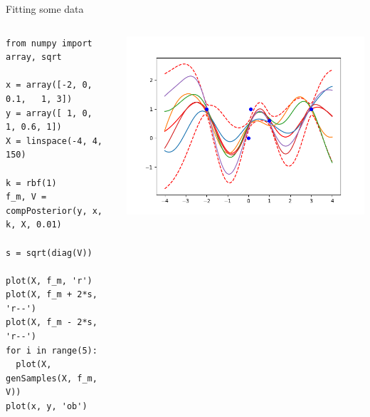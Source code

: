 \documentclass[presentation]{beamer}
\begin{document}
\begin{frame}[fragile,label={sec:org9f2662d}]{Fitting some data}
 \begin{columns}
\begin{column}{0.35\columnwidth}
\begin{verbatim}
from numpy import array, sqrt

x = array([-2, 0, 0.1,   1, 3])
y = array([ 1, 0,   1, 0.6, 1])
X = linspace(-4, 4, 150)

k = rbf(1)
f_m, V = compPosterior(y, x, k, X, 0.01)

s = sqrt(diag(V))

plot(X, f_m, 'r')
plot(X, f_m + 2*s, 'r--')
plot(X, f_m - 2*s, 'r--')
for i in range(5):
  plot(X, genSamples(X, f_m, V))
plot(x, y, 'ob')
\end{verbatim}
\end{column}


\begin{column}{0.55\columnwidth}
\begin{center}
\includegraphics[width=.9\linewidth]{images/fig04.png}
\end{center}
\end{column}
\end{columns}
\end{frame}
\end{document}
